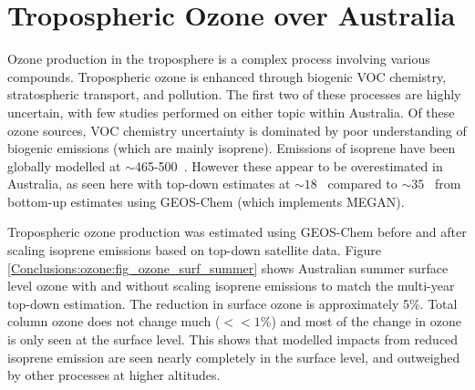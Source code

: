\section{Tropospheric Ozone over Australia}
\label{Conclusions:ozone}
  
  
  Ozone production in the troposphere is a complex process involving various compounds.
  Tropospheric ozone is enhanced through biogenic VOC chemistry, stratospheric transport, and pollution.
  The first two of these processes are highly uncertain, with few studies performed on either topic within Australia.
  Of these ozone sources, VOC chemistry uncertainty is dominated by poor understanding of biogenic emissions (which are mainly isoprene).
  Emissions of isoprene have been globally modelled at $\sim$465-500\tgcpyr ~\parencite{Guenther2006, Messina2016}. 
  However these appear to be overestimated in Australia, as seen here with top-down estimates at $\sim 18$ \tgcpyr ~compared to $\sim 35$ \tgcpyr ~from bottom-up estimates using GEOS-Chem (which implements MEGAN).
  
  
  Tropospheric ozone production was estimated using GEOS-Chem before and after scaling isoprene emissions based on top-down satellite data.
  Figure \ref{Conclusions:ozone:fig_ozone_surf_summer} shows Australian summer surface level ozone with and without scaling isoprene emissions to match the multi-year top-down estimation.
  The reduction in surface ozone is approximately 5\%.
  Total column ozone does not change much ($<<1\%$) and most of the change in ozone is only seen at the surface level.
  This shows that modelled impacts from reduced isoprene emission are seen nearly completely in the surface level, and outweighed by other processes at higher altitudes.
  
  
